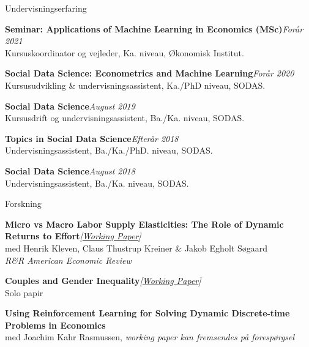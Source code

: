 \documentclass[
	10pt, %
]{resume} %
\begin{document}
\begin{rSection}{Undervisningserfaring}

    \textbf{Seminar: Applications of Machine Learning in Economics (MSc)}\hfill \textit{Forår 2021} \\
    Kursuskoordinator og vejleder, Ka. niveau, Økonomisk Institut.

    \textbf{Social Data Science: Econometrics and Machine Learning}\hfill \textit{Forår 2020} \\
    Kursusudvikling \& undervisningsassistent, Ka./PhD niveau, SODAS.

    \textbf{Social Data Science}\hfill \textit{August 2019} \\
    Kursusdrift og undervisningsassistent, Ba./Ka. niveau, SODAS.

    \textbf{Topics in Social Data Science}\hfill \textit{Efterår 2018} \\
    Undervisningsassistent, Ba./Ka./PhD. niveau, SODAS.

    \textbf{Social Data Science}\hfill \textit{August 2018} \\
    Undervisningsassistent, Ba./Ka. niveau, SODAS.
\end{rSection}


\newpage


\begin{rSection}{Forskning}

    \textbf{Micro vs Macro Labor Supply Elasticities: The Role of Dynamic Returns to Effort}\hfill \textit{[\href{https://www.nber.org/papers/w31549}{Working Paper}]} \\
    med Henrik Kleven, Claus Thustrup Kreiner \& Jakob Egholt Søgaard \\
    \textit{R\&R American Economic Review}

    \textbf{Couples and Gender Inequality}\hfill \textit{[\href{https://ssrn.com/abstract=4697847}{Working Paper}]} \\
    Solo papir

    \textbf{Using Reinforcement Learning for Solving Dynamic Discrete-time Problems in Economics} \\
    med Joachim Kahr Rasmussen, \textit{working paper kan fremsendes på forespørgsel}
\end{rSection}
\end{document}
